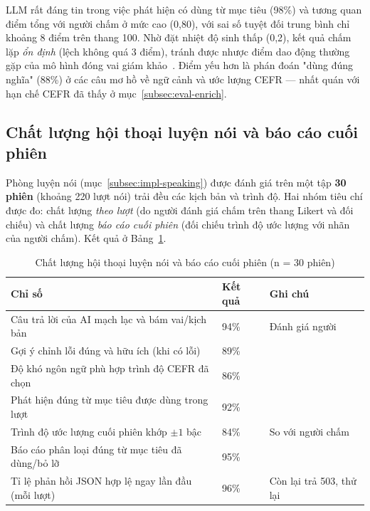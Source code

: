LLM rất đáng tin trong việc phát hiện có dùng từ mục tiêu (98\%) và tương quan
điểm tổng với người chấm ở mức cao (0,80), với sai số tuyệt đối trung bình chỉ
khoảng 8 điểm trên thang 100. Nhờ đặt nhiệt độ sinh thấp (0,2), kết quả chấm
lặp \textit{ổn định} (lệch không quá 3 điểm), tránh được nhược điểm dao động
thường gặp của mô hình đóng vai giám khảo~\cite{zheng2023judging}. Điểm yếu
hơn là phán đoán "dùng đúng nghĩa" (88\%) ở các câu mơ hồ về ngữ cảnh và ước
lượng CEFR --- nhất quán với hạn chế CEFR đã thấy ở
mục~\ref{subsec:eval-enrich}.

\subsection{Chất lượng hội thoại luyện nói và báo cáo cuối phiên}
\label{subsec:eval-speaking}

Phòng luyện nói (mục~\ref{subsec:impl-speaking}) được đánh giá trên một tập
\textbf{30 phiên} (khoảng 220 lượt nói) trải đều các kịch bản và trình độ. Hai
nhóm tiêu chí được đo: chất lượng \textit{theo lượt} (do người đánh giá chấm
trên thang Likert và đối chiếu) và chất lượng \textit{báo cáo cuối phiên}
(đối chiếu trình độ ước lượng với nhãn của người chấm). Kết quả ở
Bảng~\ref{tab:eval-speaking}.

\begin{table}[h]
  \centering
  \small
  \renewcommand{\arraystretch}{1.3}
  \begin{tabular}{|p{9.0cm}|p{2.4cm}|p{2.2cm}|}
    \hline
    \textbf{Chỉ số} & \textbf{Kết quả} & \textbf{Ghi chú} \\
    \hline
    Câu trả lời của AI mạch lạc và bám vai/kịch bản & 94\% & Đánh giá người \\
    \hline
    Gợi ý chỉnh lỗi đúng và hữu ích (khi có lỗi) & 89\% & \\
    \hline
    Độ khó ngôn ngữ phù hợp trình độ CEFR đã chọn & 86\% & \\
    \hline
    Phát hiện đúng từ mục tiêu được dùng trong lượt & 92\% & \\
    \hline
    Trình độ ước lượng cuối phiên khớp $\pm 1$ bậc & 84\% & So với người chấm \\
    \hline
    Báo cáo phân loại đúng từ mục tiêu đã dùng/bỏ lỡ & 95\% & \\
    \hline
    Tỉ lệ phản hồi JSON hợp lệ ngay lần đầu (mỗi lượt) & 96\% & Còn lại trả 503, thử lại \\
    \hline
  \end{tabular}
  \caption{Chất lượng hội thoại luyện nói và báo cáo cuối phiên (n = 30 phiên)}
  \label{tab:eval-speaking}
\end{table}

